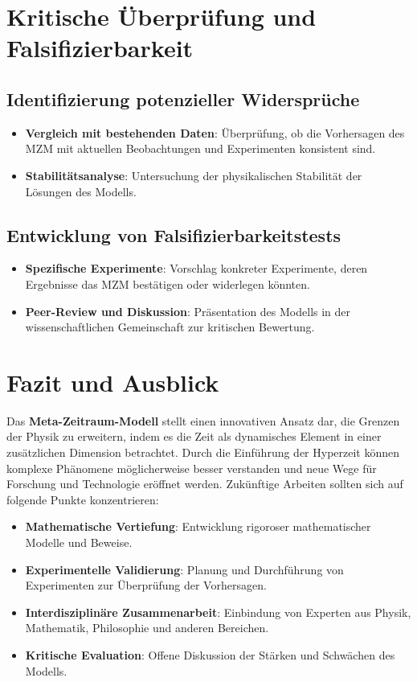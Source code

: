 \documentclass[11pt,a4paper]{article}
\begin{document}
\section{Kritische Überprüfung und Falsifizierbarkeit}

\subsection{Identifizierung potenzieller Widersprüche}

\begin{itemize}
    \item \textbf{Vergleich mit bestehenden Daten}: Überprüfung, ob die Vorhersagen des MZM mit aktuellen Beobachtungen und Experimenten konsistent sind.
    \item \textbf{Stabilitätsanalyse}: Untersuchung der physikalischen Stabilität der Lösungen des Modells.
\end{itemize}

\subsection{Entwicklung von Falsifizierbarkeitstests}

\begin{itemize}
    \item \textbf{Spezifische Experimente}: Vorschlag konkreter Experimente, deren Ergebnisse das MZM bestätigen oder widerlegen könnten.
    \item \textbf{Peer-Review und Diskussion}: Präsentation des Modells in der wissenschaftlichen Gemeinschaft zur kritischen Bewertung.
\end{itemize}

\section{Fazit und Ausblick}

Das \textbf{Meta-Zeitraum-Modell} stellt einen innovativen Ansatz dar, die Grenzen der Physik zu erweitern, indem es die Zeit als dynamisches Element in einer zusätzlichen Dimension betrachtet. Durch die Einführung der Hyperzeit können komplexe Phänomene möglicherweise besser verstanden und neue Wege für Forschung und Technologie eröffnet werden. Zukünftige Arbeiten sollten sich auf folgende Punkte konzentrieren:

\begin{itemize}
    \item \textbf{Mathematische Vertiefung}: Entwicklung rigoroser mathematischer Modelle und Beweise.
    \item \textbf{Experimentelle Validierung}: Planung und Durchführung von Experimenten zur Überprüfung der Vorhersagen.
    \item \textbf{Interdisziplinäre Zusammenarbeit}: Einbindung von Experten aus Physik, Mathematik, Philosophie und anderen Bereichen.
    \item \textbf{Kritische Evaluation}: Offene Diskussion der Stärken und Schwächen des Modells.
\end{itemize}
\end{document}
